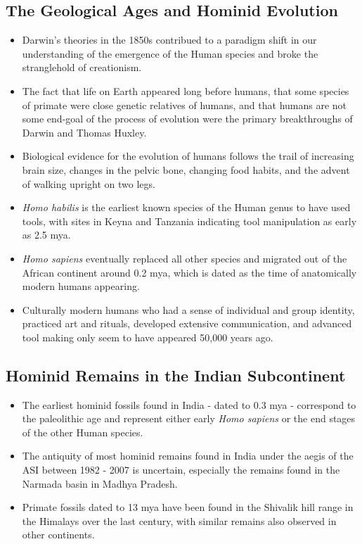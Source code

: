 \subsection{The Geological Ages and Hominid Evolution}
\begin{itemize}
    \item Darwin's theories in the 1850s contribued to a paradigm shift in our understanding of the emergence of the Human species and broke the stranglehold of \Gls{creationism}.
    \item The fact that life on Earth appeared long before humans, that some species of primate were close genetic relatives of humans, and that humans are not some end-goal of the process of evolution were the primary breakthroughs of Darwin and Thomas Huxley.
    \item Biological evidence for the evolution of humans follows the trail of increasing brain size, changes in the pelvic bone, changing food habits, and the advent of walking upright on two legs.
    \item \textit{Homo habilis} is the earliest known species of the Human genus to have used tools, with sites in Keyna and Tanzania indicating tool manipulation as early as 2.5 \gls{mya}.
    \item \textit{Homo sapiens} eventually replaced all other species and migrated out of the African continent around 0.2 mya, which is dated as the time of anatomically modern humans appearing.
    \item Culturally modern humans who had a sense of individual and group identity, practiced art and rituals, developed extensive communication, and advanced tool making only seem to have appeared 50,000 years ago.
\end{itemize}

\subsection{Hominid Remains in the Indian Subcontinent}
\begin{itemize}
    \item The earliest hominid fossils found in India  - dated to 0.3 mya - correspond to the \Gls{paleolithic age} and represent either early \textit{Homo sapiens} or the end stages of the other Human species.
    \item The antiquity of most hominid remains found in India under the aegis of the ASI between 1982 - 2007 is uncertain, especially the remains found in the Narmada basin in Madhya Pradesh.
    \item Primate fossils dated to 13 mya have been found in the Shivalik hill range in the Himalays over the last century, with similar remains also observed in other continents.
\end{itemize}

